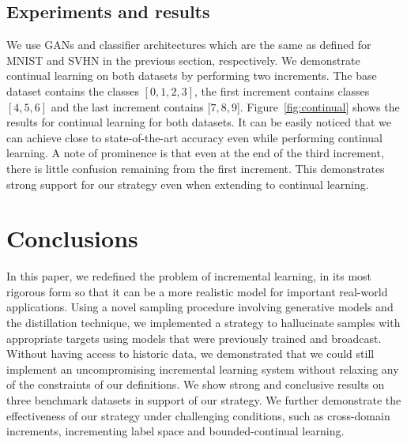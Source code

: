 \documentclass[10pt,twocolumn,letterpaper]{article}
\begin{document}
	\label{sec:continual}
	\subsection{Experiments and results}
	We use GANs and classifier architectures which are the same as defined for MNIST and SVHN in the previous section, respectively.
	We demonstrate continual learning on both datasets by performing two increments.
	The base dataset contains the classes $[0,1,2,3]$, the first increment contains classes $[4,5,6]$ and the last increment contains $[7,8,9$]. 
	Figure~\ref{fig:continual} shows the results for continual learning for both datasets.
	It can be easily noticed that we can achieve close to state-of-the-art accuracy even while performing continual learning. 
	A note of prominence is that even at the end of the third increment, there is little confusion remaining from the first increment. 
	This demonstrates strong support for our strategy even when extending to continual learning. 
	
	\section{Conclusions}
	\label{sec:conclusion}
	
	In this paper, we redefined the problem of incremental learning, in its most rigorous form so that it can be a more realistic model for important real-world applications. 
	Using a novel sampling procedure involving generative models and the distillation technique, we implemented a strategy to hallucinate samples with appropriate targets using models that were previously trained and broadcast. 
	Without having access to historic data, we demonstrated that we could still implement an uncompromising incremental learning system without relaxing any of the constraints of our definitions. We show strong and conclusive results on three benchmark datasets in support of our strategy. 
	We further demonstrate the effectiveness of our strategy under challenging conditions, such as cross-domain increments, incrementing label space and bounded-continual learning.
	
	


	
{\small
	
	
}	
\end{document}
